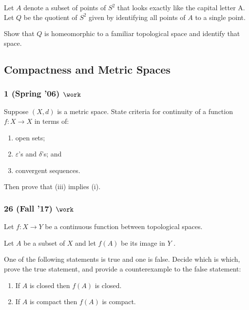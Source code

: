 Let \(A\) denote a subset of points of \(S^2\) that looks exactly like
the capital letter A. Let \(Q\) be the quotient of \(S^2\) given by
identifying all points of \(A\) to a single point.

Show that \(Q\) is homeomorphic to a familiar topological space and
identify that space.

\hypertarget{compactness-and-metric-spaces}{%
\subsection{Compactness and Metric
Spaces}\label{compactness-and-metric-spaces}}

\hypertarget{spring-06-work}{%
\subsubsection{\texorpdfstring{1 (Spring '06)
\(\work\)}{1 (Spring '06) \textbackslash work}}\label{spring-06-work}}

Suppose \((X, d)\) is a metric space. State criteria for continuity of a
function \(f : X \to X\) in terms of:

\begin{enumerate}
\def\labelenumi{\roman{enumi}.}
\item
  open sets;
\item
  \(\varepsilon\)'s and \(\delta\)'s; and
\item
  convergent sequences.
\end{enumerate}

Then prove that (iii) implies (i).

\hypertarget{fall-17-work}{%
\subsubsection{\texorpdfstring{26 (Fall '17)
\(\work\)}{26 (Fall '17) \textbackslash work}}\label{fall-17-work}}

Let \(f : X \to Y\) be a continuous function between topological spaces.

Let \(A\) be a subset of \(X\) and let \(f (A)\) be its image in \(Y\) .

One of the following statements is true and one is false. Decide which
is which, prove the true statement, and provide a counterexample to the
false statement:

\begin{enumerate}
\def\labelenumi{\arabic{enumi}.}
\item
  If \(A\) is closed then \(f (A)\) is closed.
\item
  If \(A\) is compact then \(f (A)\) is compact.
\end{enumerate}

